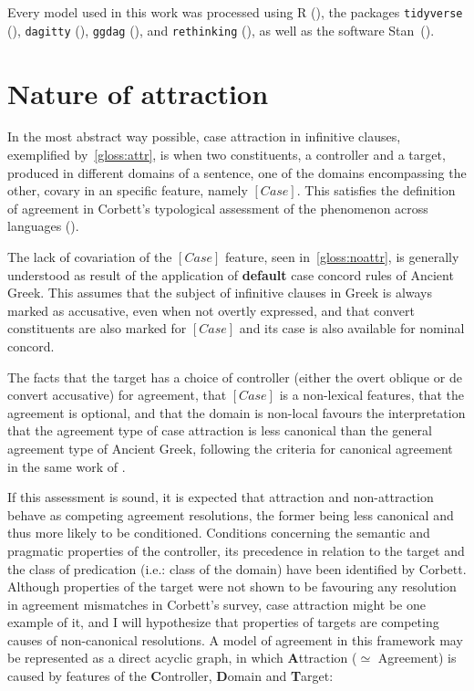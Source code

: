 \documentclass[a4paper, 12pt, article]{memoir}
\begin{document}
Every model used in this work was processed using R (\cite{R}), the packages
\texttt{tidyverse} (\cite{tidyverse}), \texttt{dagitty} (\cite{dagitty}),
\texttt{ggdag} (\cite{ggdag}), and \texttt{rethinking} (\cite{McElreath2020}),
as well as the software Stan~(\cite{StanReferenceManual,StanUserGuide}).


\chapter{Nature of attraction}\label{chap:nature_of_attraction} %

In the most abstract way possible, case attraction in infinitive clauses,
exemplified by~\ref{gloss:attr}, is when two constituents, a controller and a
target, produced in different domains of a sentence, one of the domains
encompassing the other, covary in an specific feature, namely $[Case]$.
This satisfies the definition of agreement in Corbett's typological assessment
of the phenomenon across languages (\citeyear[pp.\ 4--7]{Corbett2006}).

The lack of covariation of the $[Case]$ feature, seen in~\ref{gloss:noattr}, is
generally understood as result of the application of \textbf{default} case
concord rules of Ancient Greek.
This assumes that the subject of infinitive clauses in Greek is always marked as
accusative, even when not overtly expressed, and that convert constituents are
also marked for $[Case]$ and its case is also available for nominal concord.

The facts that the target has a choice of controller (either the overt oblique or
de convert accusative) for agreement, that $[Case]$ is a non\hyp{}lexical
features, that the agreement is optional, and that the domain is non\hyp{}local
favours the interpretation that the agreement type of case attraction is less
canonical than the general agreement type of Ancient Greek, following the
criteria for canonical agreement in the same work of \textcite[pp.\
8ff.]{Corbett2006}.

If this assessment is sound, it is expected that attraction and
non\hyp{}attraction behave as competing agreement resolutions, the former being
less canonical and thus more likely to be conditioned.
Conditions concerning the semantic and pragmatic properties of the controller,
its precedence in relation to the target and the class of predication (i.e.:
class of the domain) have been identified by Corbett.
Although properties of the target were not shown to be favouring any resolution
in agreement mismatches in Corbett's survey, case attraction might be one
example of it, and I will hypothesize that properties of targets are competing
causes of non\hyp{}canonical resolutions.
A model of agreement in this framework may be represented as a direct acyclic
graph, in which \textbf{A}ttraction ($\simeq$ Agreement) is caused by features
of the \textbf{C}ontroller, \textbf{D}omain and \textbf{T}arget:
\end{document}
